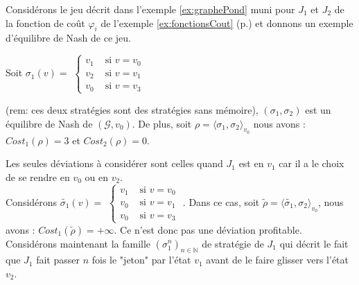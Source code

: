 
\begin{exemple}
	Considérons le jeu décrit dans l'exemple \ref{ex:graphePond} muni pour $J_{1}$ et $J_{2}$ de la fonction de coût $\varphi _{i}$ de l'exemple \ref{ex:fonctionsCout} (p.\pageref{ex:fonctionsCout}) et donnons un exemple d'équilibre de Nash de ce jeu.\\
	
	 \begin{minipage}[c]{0.30\linewidth}Soit $\sigma _{1}(v) =$ $\begin{cases}
						 v_{1} & \text{ si } v = v_{0}\\
						 v_{2} & \text{ si } v = v_{1}\\
						 v_{0} & \text{ si } v = v_{3}
						\end{cases}$ \end{minipage} \hfill
	\begin{minipage}[c]{0.30\linewidth}\end{minipage} \hfill \begin{minipage}[c]{0.30\linewidth}	 \end{minipage} \newline
		
\noindent	(rem: ces deux stratégies sont des stratégies sans mémoire), $(\sigma _{1}, \sigma _{2})$ est un équilibre de Nash de $(\mathcal{G}, v_{0})$. De plus, soit $\rho = \langle \sigma _{1},\sigma _{2} \rangle_{v_0}$ nous avons : $Cost_{1}(\rho) = 3$ et $Cost_{2}(\rho) = 0$.\\
\begin{demonstration}	
	Les seules déviations à considérer sont celles quand $J_{1}$ est en $v_{1}$ car il a le choix de se rendre en $v_{0}$ ou en $v_{2}$.\\ Considérons $\tilde{\sigma _{1}}(v) = $ $\begin{cases}
						 v_{1} & \text{ si } v = v_{0}\\
						 v_{0} & \text{ si } v = v_{1}\\
						 v_{0} & \text{ si } v = v_{3}
						\end{cases}$ .
Dans ce cas, soit $\tilde{\rho} = \langle \tilde{\sigma _{1}},\sigma _{2} \rangle_{v_0}$, nous avons : \mbox{$Cost_{1}(\tilde{\rho}) = + \infty$}. Ce n'est donc pas une déviation profitable.\\
Considérons maintenant la famille $(\sigma _{1}^{n})_{n \in \mathbb{N}}$ de stratégie de $J_{1}$ qui décrit le fait que $J_{1}$ fait passer $n$ fois le "jeton" par l'état $v_{1}$ avant de le faire glisser vers l'état $v_{2}$. \\


\end{demonstration}
\end{exemple}
